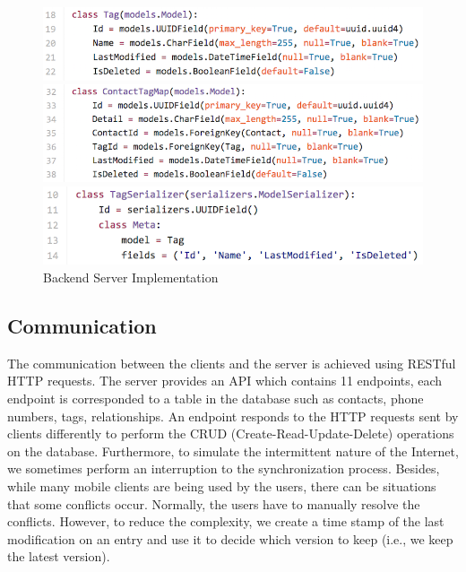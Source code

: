 \begin{figure}[!h]
\begin{centering}
\includegraphics[scale=0.5]{pics/django_tag.png}

\vspace{0.5cm}

\includegraphics[scale=0.5]{pics/django_tagmap.png}

\vspace{0.5cm}

\includegraphics[scale=0.46]{pics/django_serializer.png}
\caption{Backend Server Implementation}\label{fg:server_implementation}
\end{centering}
\end{figure}


\subsection{Communication}
The communication between the clients and the server is achieved using RESTful HTTP requests. The server provides an API which contains 11 endpoints, each endpoint is corresponded to a table in the database such as contacts, phone numbers, tags, relationships. An endpoint responds to the HTTP requests sent by clients differently to perform the CRUD (Create-Read-Update-Delete) operations on the database. Furthermore, to simulate the intermittent nature of the Internet, we sometimes perform an interruption to the synchronization process. Besides, while many mobile clients are being used by the users, there can be situations that some conflicts occur. Normally, the users have to manually resolve the conflicts. However, to reduce the complexity, we create a time stamp of the last modification on an entry and use it to decide which version to keep (i.e., we keep the latest version).

